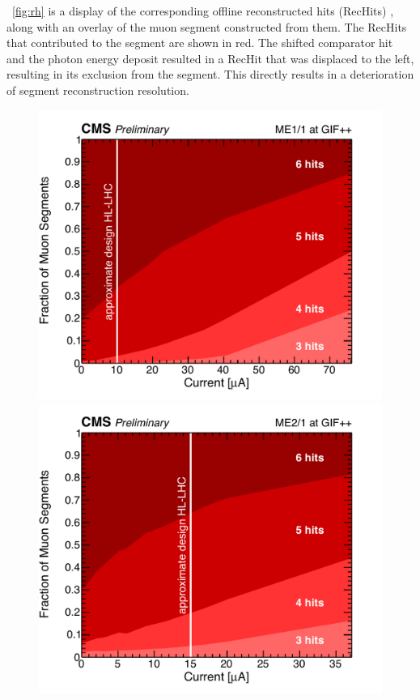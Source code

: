 \Fig~\ref{fig:rh} is a display of the corresponding offline reconstructed hits (RecHits) \cite{Barashko:2007zz}, along with an overlay of the muon segment constructed from them. The RecHits that contributed to the segment are shown in red. The shifted comparator hit and the photon energy deposit resulted in a RecHit that was displaced to the left, resulting in its exclusion from the segment. This directly results in a deterioration of segment reconstruction resolution.

\begin{figure}[htbp]
	\centering
	\includegraphics[width=.9\dummyFigWidth]{figures/neutron/SegNHitsFrac_ME11_all.pdf}
	\includegraphics[width=.9\dummyFigWidth]{figures/neutron/SegNHitsFrac_ME21_all.pdf}

\end{figure}
